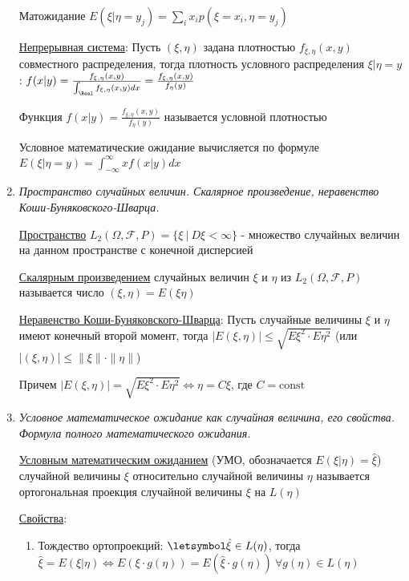 \begin{enumerate}
    Матожидание $E(\xi | \eta = y_j) = \sum_i x_i p(\xi = x_i, \eta = y_j)$

    \hyperlink{conditionaldistributionincontinuoussystem}{Непрерывная система}: 
    Пусть $(\xi, \eta)$ задана плотностью $f_{\xi, \eta}(x, y)$ совместного распределения, тогда плотность 
    условного распределения $\xi | \eta = y$: $f(x | y) = \frac{f_{\xi, \eta}(x, y)}{\int_\Real f_{\xi, \eta}(x, y)dx} = \frac{f_{\xi, \eta}(x, y)}{f_{\eta}(y)}$

    \Defs Функция $f(x | y) = \frac{f_{\xi, \eta}(x, y)}{f_{\eta}(y)}$ называется условной плотностью

    \Defs Условное математические ожидание вычисляется по формуле $E(\xi | \eta = y) = \int_{-\infty}^\infty xf(x | y)dx$

    \item \textit{Пространство случайных величин. Скалярное произведение, неравенство Коши-Буняковского-Шварца. }

    \hyperlink{spaceofrandomvariables}{Пространство} $L_2 (\Omega, \mathcal{F}, P) = \{\xi \ | \ D\xi < \infty\}$ - множество случайных величин 
    на данном пространстве с конечной дисперсией

    \hyperlink{scalarproductoftwovariables}{Скалярным произведением} случайных величин $\xi$ и $\eta$ из $L_2(\Omega, \mathcal{F}, P)$ 
    называется число $(\xi, \eta) = E(\xi\eta)$

    \hyperlink{cauchybunyakovskyschwarzinequality}{Неравенство Коши-Буняковского-Шварца}: \Ths Пусть случайные величины $\xi$ и $\eta$ имеют конечный второй момент, тогда 
    $|E(\xi, \eta)| \leq \sqrt{E\xi^2 \cdot E\eta^2}$ (или $|(\xi, \eta)| \leq \|\xi\|\cdot\|\eta\|$)

    Причем $|E(\xi, \eta)| = \sqrt{E\xi^2 \cdot E\eta^2} \Longleftrightarrow \eta = C\xi$, где $C = \mathrm{const}$

    \item \textit{Условное математическое ожидание как случайная величина, его свойства. Формула полного математического ожидания.}

    \hyperlink{conditionalexpectedvalue}{Условным математическим ожиданием} (УМО, обозначается $E(\xi|\eta) = \hat{\xi}$) случайной величины $\xi$
    относительно случайной величины $\eta$ называется ортогональная проекция случайной величины $\xi$ на $L(\eta)$ 
    
    \hyperlink{conditionalexpectedvalueproperties}{Свойства}:

    \begin{enumerate}
        \item Тождество ортопроекций: $\letsymbol \hat{\xi} \in L(\eta)$, тогда $\hat{\xi} = E(\xi|\eta) \Longleftrightarrow E(\xi\cdot g(\eta)) = E(\hat{\xi}\cdot g(\eta)) \ \forall g(\eta) \in L(\eta)$


\end{enumerate}
\end{enumerate}
